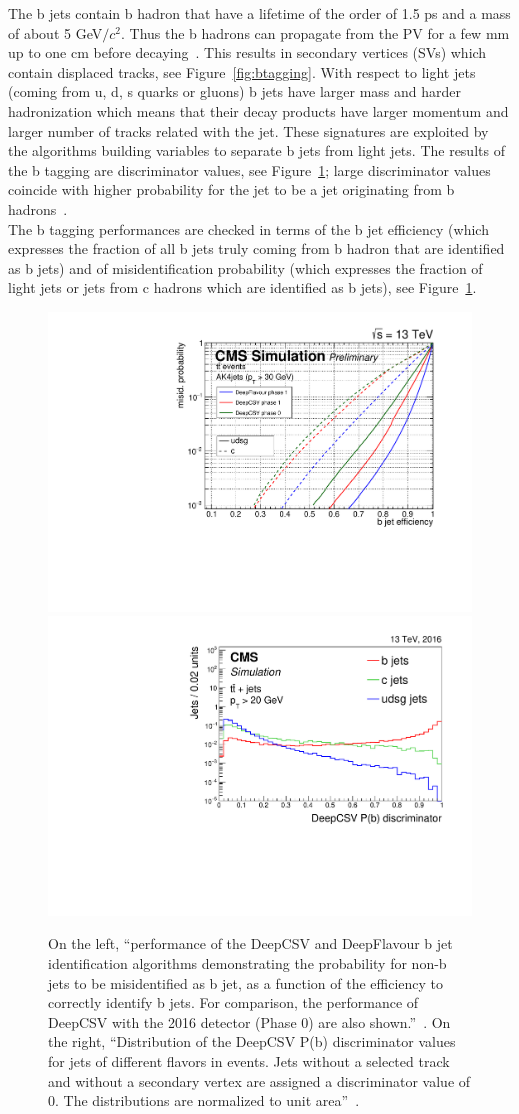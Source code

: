 The b jets contain b hadron that have a lifetime of the order of 1.5
ps and a mass of about
5 GeV$/c^{2}$. Thus the b hadrons can propagate from
the PV for a few mm up to one cm before decaying~\cite{Sirunyan_2018_btagging}. This results in
 secondary vertices (SVs) which contain displaced tracks, see
Figure~\ref{fig:btagging}. With respect to light jets (coming from
u, d, s quarks or gluons) b jets have larger mass and harder hadronization which
means that their decay products have larger momentum and larger number
of tracks related with the jet. These signatures are exploited by the
algorithms building variables to separate b jets from
light jets. The results of the b tagging are discriminator values, see Figure~\ref{fig:taggingperformance}; large discriminator values coincide with higher probability for
the jet to be a jet originating from b hadrons~\cite{CMS-DP-2017-013,
  csv}.\\
The b tagging performances are checked in terms of the b jet
efficiency (which expresses the fraction of all b jets truly coming from b hadron
that are identified as b jets) and of misidentification probability
(which expresses the fraction of light jets or jets from c hadrons
which are identified as b jets), see
Figure~\ref{fig:taggingperformance}. 

\begin{figure}[h]
\centering
\includegraphics[width=.49\textwidth]{Figures/c2/PT30GeV.pdf}
\includegraphics[width=.49\textwidth]{Figures/c2/CMS-BTV-16-002_Figure_013-a.pdf}
\caption{On the left, ``performance of the DeepCSV and DeepFlavour b
  jet identification algorithms demonstrating the probability for
  non-b jets to be misidentified as b jet, as a function of the
  efficiency to correctly identify b jets. For comparison, the performance of DeepCSV
  with the 2016 detector (Phase 0) are also shown.''~\cite{csv}. On
  the right, ``Distribution of the DeepCSV P(b) discriminator values
  for jets of different flavors in \ttbar events. Jets without a
  selected track and without a secondary vertex are assigned a
  discriminator value of 0. The distributions are normalized to unit area''~\cite{csv}.}
\label{fig:taggingperformance}
\end{figure}

